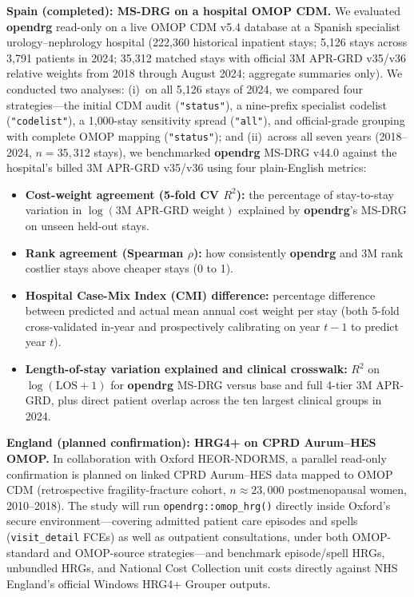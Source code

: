 \documentclass[fleqn,10pt]{IOMEDArticle}
\begin{document}
\textbf{Spain (completed): MS-DRG on a hospital OMOP CDM.} We evaluated \textbf{opendrg} read-only on a live OMOP CDM v5.4 database at a Spanish specialist urology--nephrology hospital (222{,}360 historical inpatient stays; 5{,}126 stays across 3{,}791 patients in 2024; 35{,}312 matched stays with official 3M APR-GRD v35/v36 relative weights from 2018 through August 2024; aggregate summaries only). We conducted two analyses: (i)~on all 5{,}126 stays of 2024, we compared four strategies---the initial CDM audit (\texttt{"status"}), a nine-prefix specialist codelist (\texttt{"codelist"}), a 1{,}000-stay sensitivity spread (\texttt{"all"}), and official-grade grouping with complete OMOP mapping (\texttt{"status"}); and (ii)~across all seven years (2018--2024, $n = 35{,}312$ stays), we benchmarked \textbf{opendrg} MS-DRG v44.0 against the hospital's billed 3M APR-GRD v35/v36 using four plain-English metrics:
\begin{itemize}[leftmargin=*,nosep]
    \item \textbf{Cost-weight agreement (5-fold CV $R^2$):} the percentage of stay-to-stay variation in $\log(\text{3M APR-GRD weight})$ explained by \textbf{opendrg}'s MS-DRG on unseen held-out stays.
    \item \textbf{Rank agreement (Spearman $\rho$):} how consistently \textbf{opendrg} and 3M rank costlier stays above cheaper stays (0 to 1).
    \item \textbf{Hospital Case-Mix Index (CMI) difference:} percentage difference between predicted and actual mean annual cost weight per stay (both 5-fold cross-validated in-year and prospectively calibrating on year $t-1$ to predict year $t$).
    \item \textbf{Length-of-stay variation explained and clinical crosswalk:} $R^2$ on $\log(\text{LOS}+1)$ for \textbf{opendrg} MS-DRG versus base and full 4-tier 3M APR-GRD, plus direct patient overlap across the ten largest clinical groups in 2024.
\end{itemize}

\textbf{England (planned confirmation): HRG4+ on CPRD Aurum--HES OMOP.} In collaboration with Oxford HEOR-NDORMS, a parallel read-only confirmation is planned on linked CPRD Aurum--HES data mapped to OMOP CDM (retrospective fragility-fracture cohort, $n \approx 23{,}000$ postmenopausal women, 2010--2018). The study will run \texttt{opendrg::omop\_hrg()} directly inside Oxford's secure environment---covering admitted patient care episodes and spells (\texttt{visit\_detail} FCEs) as well as outpatient consultations, under both OMOP-standard and OMOP-source strategies---and benchmark episode/spell HRGs, unbundled HRGs, and National Cost Collection unit costs directly against NHS England's official Windows HRG4+ Grouper outputs.
\end{document}
